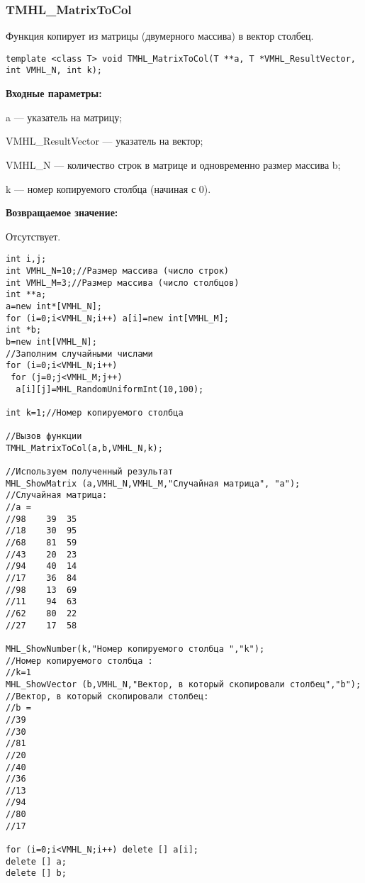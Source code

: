 \documentclass[a4paper,12pt]{article}
\begin{document}
\subsubsection{TMHL\_MatrixToCol}\label{TMHL_MatrixToCol}

Функция копирует из матрицы (двумерного массива) в вектор столбец.


\begin{lstlisting}[label=code_syntax_TMHL_MatrixToCol,caption=Синтаксис]
template <class T> void TMHL_MatrixToCol(T **a, T *VMHL_ResultVector, int VMHL_N, int k);
\end{lstlisting}

\textbf{Входные параметры:}  
 
a --- указатель на матрицу;
 
VMHL\_ResultVector --- указатель на вектор;
 
VMHL\_N --- количество строк в матрице и одновременно размер массива b;
 
k --- номер копируемого столбца (начиная с 0).

\textbf{Возвращаемое значение:}

Отсутствует.


\begin{lstlisting}[label=code_use_TMHL_MatrixToCol,caption=Пример использования]
int i,j;
int VMHL_N=10;//Размер массива (число строк)
int VMHL_M=3;//Размер массива (число столбцов)
int **a;
a=new int*[VMHL_N];
for (i=0;i<VMHL_N;i++) a[i]=new int[VMHL_M];
int *b;
b=new int[VMHL_N];
//Заполним случайными числами
for (i=0;i<VMHL_N;i++)
 for (j=0;j<VMHL_M;j++)
  a[i][j]=MHL_RandomUniformInt(10,100);

int k=1;//Номер копируемого столбца

//Вызов функции
TMHL_MatrixToCol(a,b,VMHL_N,k);

//Используем полученный результат
MHL_ShowMatrix (a,VMHL_N,VMHL_M,"Случайная матрица", "a");
//Случайная матрица:
//a =	
//98	39	35
//18	30	95
//68	81	59
//43	20	23
//94	40	14
//17	36	84
//98	13	69
//11	94	63
//62	80	22
//27	17	58

MHL_ShowNumber(k,"Номер копируемого столбца ","k");
//Номер копируемого столбца :
//k=1
MHL_ShowVector (b,VMHL_N,"Вектор, в который скопировали столбец","b");
//Вектор, в который скопировали столбец:
//b =	
//39
//30
//81
//20
//40
//36
//13
//94
//80
//17

for (i=0;i<VMHL_N;i++) delete [] a[i];
delete [] a;
delete [] b;
\end{lstlisting}
\end{document}
